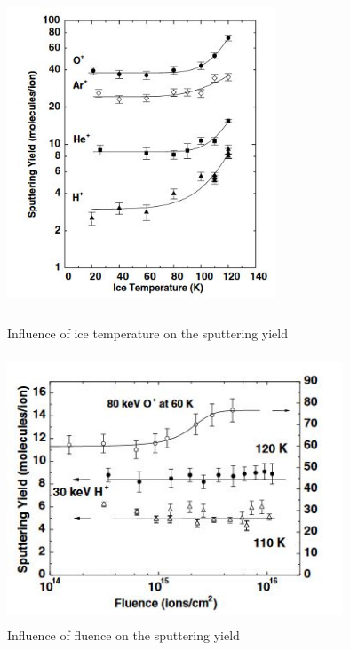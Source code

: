 \begin{figure}[htb]
\centering
\includegraphics[width=8cm, height=10cm, clip]{Paul/sputtering30kev.JPG}
\caption{Influence of ice temperature on the sputtering yield}
\label{sputtering30kev}
\end{figure}
    
\begin{figure}[htb]
\centering
\includegraphics[width=10cm, height=8cm, clip]{Paul/sputteringfluence.JPG}
\caption{Influence of fluence on the sputtering yield}
\label{sputteringfluence}
\end{figure}
    
